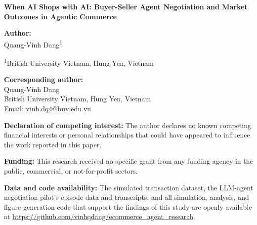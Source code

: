 \documentclass[12pt]{article}
\begin{document}
\begin{center}
{\Large \textbf{When AI Shops with AI: Buyer-Seller Agent Negotiation and Market Outcomes in Agentic Commerce}}
\end{center}

\vspace{1cm}

\noindent\textbf{Author:}\\
Quang-Vinh Dang\textsuperscript{1}

\vspace{0.3cm}

\noindent\textsuperscript{1}British University Vietnam, Hung Yen, Vietnam

\vspace{1cm}

\noindent\textbf{Corresponding author:}\\
Quang-Vinh Dang\\
British University Vietnam, Hung Yen, Vietnam\\
Email: \href{mailto:vinh.dq4@buv.edu.vn}{vinh.dq4@buv.edu.vn}

\vspace{1cm}

\noindent\textbf{Declaration of competing interest:} The author declares no known competing financial interests or personal relationships that could have appeared to influence the work reported in this paper.

\vspace{0.5cm}

\noindent\textbf{Funding:} This research received no specific grant from any funding agency in the public, commercial, or not-for-profit sectors.

\vspace{0.5cm}

\noindent\textbf{Data and code availability:} The simulated transaction dataset, the LLM-agent negotiation pilot's episode data and transcripts, and all simulation, analysis, and figure-generation code that support the findings of this study are openly available at \url{https://github.com/vinhqdang/ecommerce_agent_research}.
\end{document}
